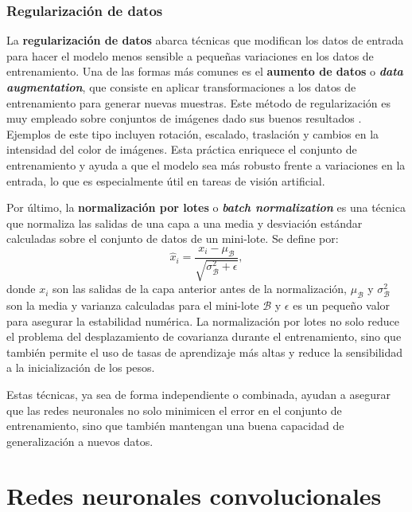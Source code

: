 \subsubsection{Regularización de datos}

La \textbf{regularización de datos} abarca técnicas que modifican los datos de entrada para hacer el modelo menos sensible a pequeñas variaciones en los datos de entrenamiento. Una de las formas más comunes es el \textbf{aumento de datos} o \textbf{\textit{data augmentation}}, que consiste en aplicar transformaciones a los datos de entrenamiento para generar nuevas muestras. Este método de regularización es muy empleado sobre conjuntos de imágenes dado sus buenos resultados \cite{alexnet}. Ejemplos de este tipo incluyen rotación, escalado, traslación y cambios en la intensidad del color de imágenes. Esta práctica enriquece el conjunto de entrenamiento y ayuda a que el modelo sea más robusto frente a variaciones en la entrada, lo que es especialmente útil en tareas de visión artificial.

Por último, la \textbf{normalización por lotes} o \textbf{\textit{batch normalization}} es una técnica que normaliza las salidas de una capa a una media y desviación estándar calculadas sobre el conjunto de datos de un mini-lote. Se define por:
\begin{equation}
	\hat{x}_i = \frac{x_i - \mu_{\mathcal{B}}}{\sqrt{\sigma^2_{\mathcal{B}} + \epsilon}},
\end{equation}
donde \(x_i\) son las salidas de la capa anterior antes de la normalización, \(\mu_{\mathcal{B}}\) y \(\sigma^2_{\mathcal{B}}\) son la media y varianza calculadas para el mini-lote \(\mathcal{B}\) y \(\epsilon\) es un pequeño valor para asegurar la estabilidad numérica. La normalización por lotes no solo reduce el problema del desplazamiento de covarianza durante el entrenamiento, sino que también permite el uso de tasas de aprendizaje más altas y reduce la sensibilidad a la inicialización de los pesos.


Estas técnicas, ya sea de forma independiente o combinada, ayudan a asegurar que las redes neuronales no solo minimicen el error en el conjunto de entrenamiento, sino que también mantengan una buena capacidad de generalización a nuevos datos.


\section{Redes neuronales convolucionales}

